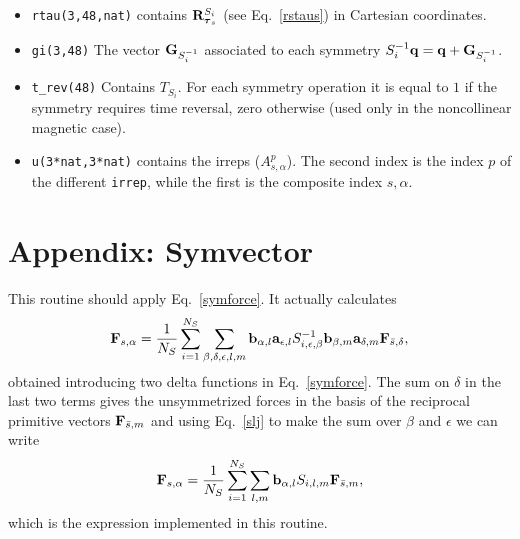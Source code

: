 \documentclass[12pt,a4paper,twoside]{report}
\begin{document}
\begin{itemize}
\item 
\texttt{rtau(3,48,nat)} contains ${\bf R}^{S_i}_{\boldsymbol{\tau}_s}$ (see Eq.~\ref{rstaus}) in Cartesian coordinates.

\item
\texttt{gi(3,48)} The vector ${\bf G}_{S_i^{-1}}$
associated to each symmetry $S_i^{-1}{\bf q}={\bf q}+{\bf G}_{S_i^{-1}}$.

\item 
\texttt{t\_rev(48)} Contains $T_{S_i}$.  For each symmetry operation it is equal to $1$ if the symmetry requires time reversal, zero otherwise (used only in the noncollinear magnetic case).

\item
\texttt{u(3*nat,3*nat)} contains the irreps
($A^p_{s,\alpha}$). The second index is the
index $p$ of the different \texttt{irrep}, while the first is the composite index ${s,\alpha}$.

\end{itemize}

\section{Appendix: Symvector} 
This routine should apply Eq.~\ref{symforce}. It actually calculates 
\begin{equation}
{\bf F}_{s,\alpha} ={1 \over N_S} \sum_{i=1}^{N_S} \sum_{\beta, \delta, \epsilon, l, m} {\bf b}_{\alpha,l} {\bf a}_{\epsilon,l} S^{-1}_{i,\epsilon,\beta} {\bf b}_{\beta,m} {\bf a}_{\delta,m}
{\bf F}_{\bar s,\delta},
\label{symforceapp1}
\end{equation}
obtained introducing two delta functions in Eq.~\ref{symforce}. The sum on $\delta$ in the last two terms gives the unsymmetrized forces in the basis of the
reciprocal primitive vectors ${\bf F}_{{\bar s},m}$ and
using Eq.~\ref{slj} to make the sum over {$\beta$ and $\epsilon$} we can write 
\begin{equation}
{\bf F}_{s,\alpha} ={1 \over N_S} \sum_{i=1}^{N_S} \sum_{l, m} {\bf b}_{\alpha,l} S_{i,l,m}  {\bf F}_{\bar s,m},
\label{symforceapp2}
\end{equation}
which is the expression implemented in this routine.
\end{document}
